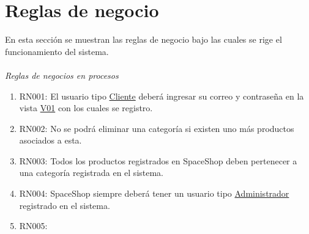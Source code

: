 \chapter{Reglas de negocio}
	En esta secci\'on se muestran las reglas de negocio bajo las cuales se rige el funcionamiento del sistema.\\
	\\
	\textit{\large Reglas de negocios en procesos}
	\begin{enumerate}
		\item RN001: El usuario tipo \hyperlink{Cliente}{Cliente} deber\'a ingresar su correo y contrase\~na en la vista \hyperlink{V01}{V01} con los cuales se registro.
		\item RN002: No se podr\'a eliminar una categor\'ia si existen uno m\'as productos asociados a esta.
		\item RN003: Todos los productos registrados en SpaceShop deben pertenecer a una categor\'ia registrada en el sistema.
		\item RN004: SpaceShop siempre deber\'a tener un usuario tipo \hyperlink{Administrador}{Administrador} registrado en el sistema.
		\item RN005: 
	\end{enumerate}
